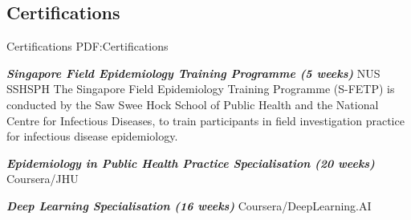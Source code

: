 \documentclass[letterpaper,10pt,oneside]{article}
\begin{document}
\begin{body}




\section
{Certifications}
{Certifications}
{PDF:Certifications}


\textbf{\textit{Singapore Field Epidemiology Training Programme (5 weeks)}} NUS SSHSPH 
\hfill
{}
\BulletItem
The Singapore Field Epidemiology Training Programme (S-FETP) is conducted by the Saw Swee Hock School of Public Health and the National Centre for Infectious Diseases, to train participants in field investigation practice for infectious disease epidemiology.

\textbf{\textit{Epidemiology in Public Health Practice Specialisation (20 weeks)}} Coursera/JHU 
\hfill
{}

\textbf{\textit{Deep Learning Specialisation (16 weeks)}} Coursera/DeepLearning.AI 
\hfill
{}


\end{body}
\end{document}
